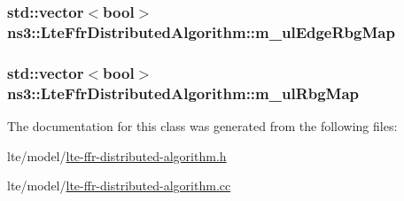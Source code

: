 \subsubsection[{\texorpdfstring{m\+\_\+ul\+Edge\+Rbg\+Map}{m_ulEdgeRbgMap}}]{\setlength{\rightskip}{0pt plus 5cm}std\+::vector$<$bool$>$ ns3\+::\+Lte\+Ffr\+Distributed\+Algorithm\+::m\+\_\+ul\+Edge\+Rbg\+Map\hspace{0.3cm}{\ttfamily [private]}}\hypertarget{classns3_1_1LteFfrDistributedAlgorithm_a9a2969aa567092eb87a9802fc2fed706}{}\label{classns3_1_1LteFfrDistributedAlgorithm_a9a2969aa567092eb87a9802fc2fed706}
\subsubsection[{\texorpdfstring{m\+\_\+ul\+Rbg\+Map}{m_ulRbgMap}}]{\setlength{\rightskip}{0pt plus 5cm}std\+::vector$<$bool$>$ ns3\+::\+Lte\+Ffr\+Distributed\+Algorithm\+::m\+\_\+ul\+Rbg\+Map\hspace{0.3cm}{\ttfamily [private]}}\hypertarget{classns3_1_1LteFfrDistributedAlgorithm_a8de1fc607261f9a0bec77c10fc44b818}{}\label{classns3_1_1LteFfrDistributedAlgorithm_a8de1fc607261f9a0bec77c10fc44b818}


The documentation for this class was generated from the following files\+:\begin{DoxyCompactItemize}
\item 
lte/model/\hyperlink{lte-ffr-distributed-algorithm_8h}{lte-\/ffr-\/distributed-\/algorithm.\+h}\item 
lte/model/\hyperlink{lte-ffr-distributed-algorithm_8cc}{lte-\/ffr-\/distributed-\/algorithm.\+cc}\end{DoxyCompactItemize}
